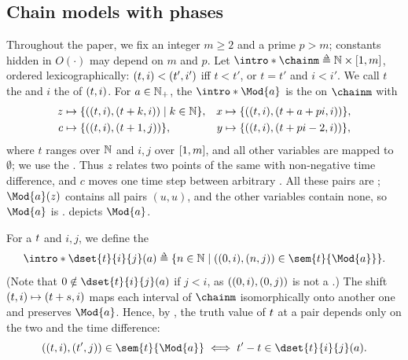 \subsection{Chain models with phases}\label{section: chain models}

\AP Throughout the paper, we fix an integer $m \ge 2$ and a prime $p > m$; constants hidden in $O(\cdot)$ may depend on $m$ and $p$.
\AP Let $\intro*\chainm \defeq \nat \times \range{1, m}$, ordered lexicographically: $(t, i) < (t', i')$ iff $t < t'$, or $t = t'$ and $i < i'$.
We call $t$ the  and $i$ the  of $(t, i)$.
\AP For $a \in \mathbb{N}_{+}$, the  $\intro*\Mod{a}$ is the  on $\chainm$ with
\begin{align*}
    z &\mapsto \{((t, i), (t+k, i)) \mid k \in \mathbb{N}\}, &
    x &\mapsto \{((t, i), (t + a + p i, i))\}, \\
    c &\mapsto \{((t, i), (t+1, j))\}, &
    y &\mapsto \{((t, i), (t + p i - 2, i))\},
\end{align*}
where $t$ ranges over $\mathbb{N}$ and $i, j$ over $[1, m]$, and all other variables are mapped to $\emptyset$; we use the .
Thus $z$ relates two points of the same  with non-negative time difference, and $c$ moves one time step between arbitrary .
All these pairs are ; $\Mod{a}(z)$ contains all pairs $(u, u)$, and the other variables contain none, so $\Mod{a}$ is .
 depicts $\Mod{a}$.

\AP For a  $\term$ and  $i, j$, we define the 
\[\intro*\dset{\term}{i}{j}(a) \defeq \set{n \in \nat \mid (\pt{0}{i}, \pt{n}{j}) \in \sem{\term}{\Mod{a}}}.\]
(Note that $0 \notin \dset{\term}{i}{j}(a)$ if $j < i$, as $((0, i), (0, j))$ is not a .)
The shift $(t, i) \mapsto (t+s, i)$ maps each interval of $\chainm$ isomorphically onto another one and preserves $\Mod{a}$.
Hence, by , the truth value of $\term$ at a pair depends only on the two  and the time difference:
\begin{equation}
    (\pt{t}{i}, \pt{t'}{j}) \in \sem{\term}{\Mod{a}} \iff t' - t \in \dset{\term}{i}{j}(a). \label{equation: shift}
\end{equation}
